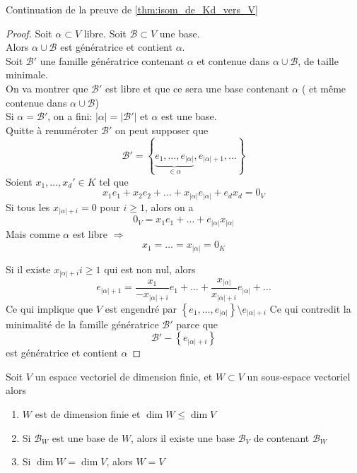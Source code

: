 \documentclass[../main.tex]{subfiles}
\begin{document}

Continuation de la preuve de \ref{thm:isom_de_Kd_vers_V}
\begin{proof}
Soit $\alpha \subset V$ libre. Soit  $\mathcal{B}\subset V$ une base.\\
Alors $\alpha\cup \mathcal{B}$ est génératrice et contient $\alpha$.\\
Soit $\mathcal{B}'$ une famille génératrice contenant $\alpha$ et contenue dans $\alpha \cup \mathcal{B}$, de taille minimale.\\
On va montrer que $\mathcal{B}'$ est libre et que ce sera une base contenant $\alpha$ ( et même contenue dans $\alpha \cup \mathcal{B}$) \\
Si $\alpha = \mathcal{B}'$, on a fini: $|\alpha| = |\mathcal{B}'|$ et  $\alpha$ est une base.\\
Quitte à renuméroter $\mathcal{B}'$ on peut supposer que
\[ 
\mathcal{B}' = \left\{ \underbrace{e_1, \ldots, e_{|\alpha|}}_{\in \alpha} , e_{|\alpha|+1} , \ldots  \right\} 
\]
Soient $x_1, \ldots, x_{d}' \in K$ tel que
\[ 
	x_1 e_1 + x_2e_2 + \ldots + x_{|\alpha|} e_{|\alpha|}  + e_d x_d = 0_V
\]
Si tous les $x_{|\alpha| + i} = 0$ pour $i \geq 1$, alors on a
\[ 
0_V = x_1e_1 + \ldots + e_{|\alpha|} x_{|\alpha|} 
\]
Mais comme $\alpha$ est libre $\Rightarrow$ 
\[ 
x_1 = \ldots = x_{|\alpha|}  = 0_K
\]

Si il existe $x_{|\alpha|+i} i \geq 1$ qui est non nul, alors
\[ 
	e_{|\alpha| + 1}  = \frac{x_1}{- x_{|\alpha| + i}} e_1 + \ldots + \frac{x_{|\alpha|} }{x_{|\alpha| + i}} e_{|\alpha|}  + \ldots
\]
Ce qui implique que $V$ est engendré par $ \left\{ e_1, \ldots, e_{|\alpha|}  \right\} \setminus e_{|\alpha| + i} $ Ce qui contredit la minimalité de la famille génératrice $\mathcal{B}'$ parce que 
\[ 
\mathcal{B}' - \left\{ e_{|\alpha| + i}  \right\}
\]
est génératrice et contient $\alpha$

\end{proof}
\begin{thm}\label{thm:dim_de_sev}
	Soit $V$ un espace vectoriel de dimension finie, et $W \subset V$ un sous-espace vectoriel alors
	\begin{enumerate}
		\item $W$ est de dimension finie et $\dim W \leq \dim V$ 
		\item Si $\mathcal{B}_W$ est une base de $W$, alors il existe une base $\mathcal{B}_V$ de contenant $\mathcal{B}_W$ 
		\item Si $\dim W = \dim V$, alors $W = V$
	\end{enumerate}
	
\end{thm}
\end{document}

